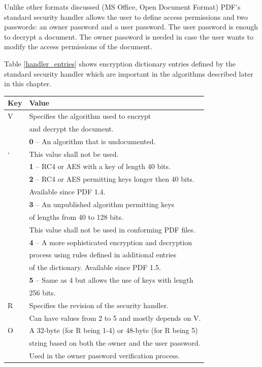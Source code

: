 \documentclass[11pt,oneside]{fithesis2}
\begin{document}
Unlike other formats discussed (MS Office, Open Document Format) PDF's standard security handler allows the user to define access permissions and two passwords: an owner password and a user password. The user password is enough to decrypt a document. The owner password is needed in case the user wants to modify the access permissions of the document.

Table \ref{handler_entries} shows encryption dictionary entries defined by the standard security handler which are important in the algorithms described later in this chapter.

\begin{table}[hp]
	\centering
	\begin{tabular}{|l|l|}
               	\hline
		\textbf{Key}&\textbf{Value}\\
		\hline
		V&Specifies the algorithm used to encrypt \\
		&and decrypt the document.\\
		&\textbf{0} -- An algorithm that is undocumented.\\
	`	&This value shall not be used.\\
		&\textbf{1} -- RC4 or AES with a key of length 40 bits.\\
		&\textbf{2} -- RC4 or AES permitting keys longer then 40 bits.\\
		&Available since PDF 1.4.\\
		&\textbf{3} -- An unpublished algorithm permitting keys\\
		&of lengths from 40 to 128 bits.\\
		&This value shall not be used in conforming PDF files.\\
		&\textbf{4} -- A more sophisticated encryption and decryption\\
		&process using rules defined in additional entries\\
		&of the dictionary. Available since PDF 1.5.\\
		&\textbf{5} -- Same as 4 but allows the use of keys with length\\
		&256 bits.\\
	\hline
		R&Specifies the revision of the security handler.\\
		&Can have values from 2 to 5 and mostly depends on V.\\
	\hline
		O&A 32-byte (for R being 1-4) or 48-byte (for R being 5)\\ 
		&string based on both the owner and the user password.\\
		&Used in the owner password verification process.\\

\end{tabular}
\end{table}
\end{document}
